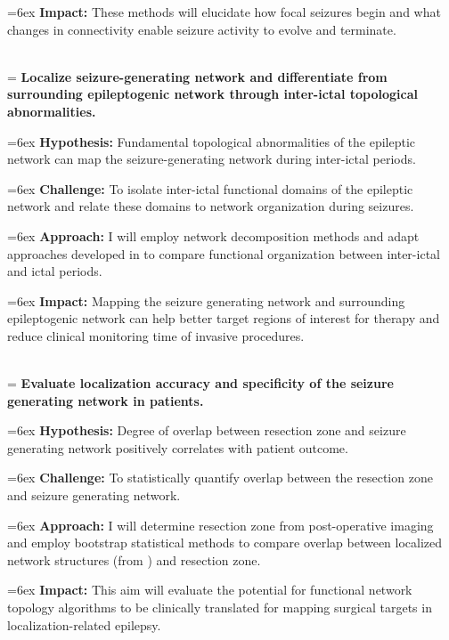 \hangindent=6ex
\textbf{Impact:} These methods will elucidate how focal seizures begin and what changes in connectivity enable seizure activity to evolve and terminate.

~\\
\hangindent=\parindent
{}
\noindent
{} \textbf{Localize seizure-generating network and differentiate from surrounding epileptogenic network through inter-ictal topological abnormalities.}

\hangindent=6ex
\textbf{Hypothesis:} Fundamental topological abnormalities of the epileptic network can map the seizure-generating network during inter-ictal periods.

\hangindent=6ex
\textbf{Challenge:} To isolate inter-ictal functional domains of the epileptic network and relate these domains to network organization during seizures.

\hangindent=6ex
\textbf{Approach:} I will employ network decomposition methods and adapt approaches developed in  to compare functional organization between inter-ictal and ictal periods.

\hangindent=6ex
\textbf{Impact:} Mapping the seizure generating network and surrounding epileptogenic network can help better target regions of interest for therapy and reduce clinical monitoring time of invasive procedures.

~\\
\hangindent=\parindent
{}
\noindent
{} \textbf{Evaluate localization accuracy and specificity of the seizure generating network in patients.}

\hangindent=6ex
\textbf{Hypothesis:} Degree of overlap between resection zone and seizure generating network positively correlates with patient outcome.

\hangindent=6ex
\textbf{Challenge:} To statistically quantify overlap between the resection zone and seizure generating network.

\hangindent=6ex
\textbf{Approach:} I will determine resection zone from post-operative imaging and employ bootstrap statistical methods to compare overlap between localized network structures (from ) and resection zone.

\hangindent=6ex
\textbf{Impact:} This aim will evaluate the potential for functional network topology algorithms to be clinically translated for mapping surgical targets in localization-related epilepsy.
